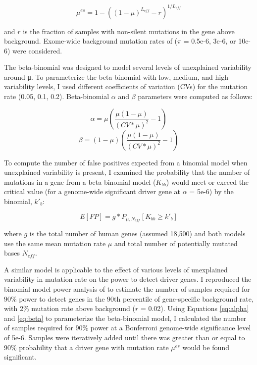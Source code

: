 \begin{equation}
\mu^{es} = 1 - ((1-\mu)^{L_{eff}}-r)^{1/L_{eff}}
\end{equation}

and $r$ is the fraction of samples with non-silent mutations in the gene above background. Exome-wide background mutation rates of ($\pi$ = 0.5e-6, 3e-6, or 10e-6) were considered.

The beta-binomial was designed to model several levels of unexplained variability around μ. To parameterize the beta-binomial with low, medium, and high variability levels, I used different coefficients of variation (CVs) for the mutation rate (0.05, 0.1, 0.2). Beta-binomial $\alpha$ and $\beta$ parameters were computed as follows:

\begin{equation}
\label{eq:alpha}
\alpha = \mu\left(\frac{\mu(1-\mu)}{(CV*\mu)^2}-1\right)
\end{equation}
\begin{equation}
\label{eq:beta}
\beta = (1-\mu)\left(\frac{\mu(1-\mu)}{(CV*\mu)^2}-1\right)
\end{equation}

To compute the number of false positives expected from a binomial model when unexplained variability is present, I examined the probability that the number of mutations in a gene from a beta-binomial model ($K_{bb}$) would meet or exceed the critical value (for a genome-wide significant driver gene at $\alpha$ = 5e-6) by the binomial, $k'_b$:

\begin{equation}
E[FP] = g*P_{\mu,N_{eff}}[K_{bb}\geq k'_b]
\end{equation}

where $g$ is the total number of human genes (assumed 18,500) and both models use the same mean mutation rate $\mu$ and total number of potentially mutated bases $N_{eff}$.

A similar model is applicable to the effect of various levels of unexplained variability in mutation rate on the power to detect driver genes. I reproduced the binomial model power analysis of \cite{RN14} to estimate the number of samples required for 90\% power to detect genes in the 90th percentile of gene-specific background rate, with 2\% mutation rate above background ($r$ = 0.02). Using Equations \ref{eq:alpha} and \ref{eq:beta} to parameterize the beta-binomial model, I calculated the number of samples required for 90\% power at a Bonferroni genome-wide significance level of 5e-6. Samples were iteratively added until there was greater than or equal to 90\% probability that a driver gene with mutation rate $\mu^{es}$ would be found significant. 

